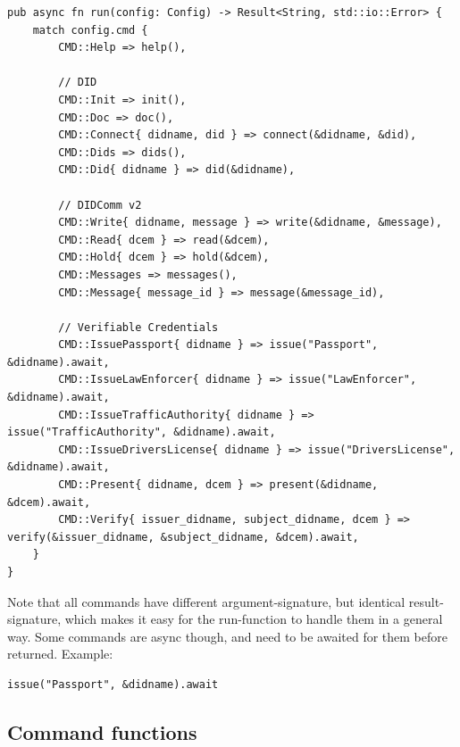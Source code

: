 \begin{lstlisting}
pub async fn run(config: Config) -> Result<String, std::io::Error> {
    match config.cmd {
        CMD::Help => help(),

        // DID
        CMD::Init => init(),
        CMD::Doc => doc(),
        CMD::Connect{ didname, did } => connect(&didname, &did),
        CMD::Dids => dids(),
        CMD::Did{ didname } => did(&didname),

        // DIDComm v2
        CMD::Write{ didname, message } => write(&didname, &message),
        CMD::Read{ dcem } => read(&dcem),
        CMD::Hold{ dcem } => hold(&dcem),
        CMD::Messages => messages(),
        CMD::Message{ message_id } => message(&message_id),

        // Verifiable Credentials
        CMD::IssuePassport{ didname } => issue("Passport", &didname).await,
        CMD::IssueLawEnforcer{ didname } => issue("LawEnforcer", &didname).await,
        CMD::IssueTrafficAuthority{ didname } => issue("TrafficAuthority", &didname).await,
        CMD::IssueDriversLicense{ didname } => issue("DriversLicense", &didname).await,
        CMD::Present{ didname, dcem } => present(&didname, &dcem).await,
        CMD::Verify{ issuer_didname, subject_didname, dcem } => verify(&issuer_didname, &subject_didname, &dcem).await,
    }
}
\end{lstlisting}

Note that all commands have different argument-signature, but identical
result-signature, which makes it easy for the run-function to handle
them in a general way. Some commands are async though, and need to be
awaited for them before returned. Example:

\begin{lstlisting}
issue("Passport", &didname).await
\end{lstlisting}

\hypertarget{command-functions}{%
\subsection{Command functions}\label{command-functions}}

